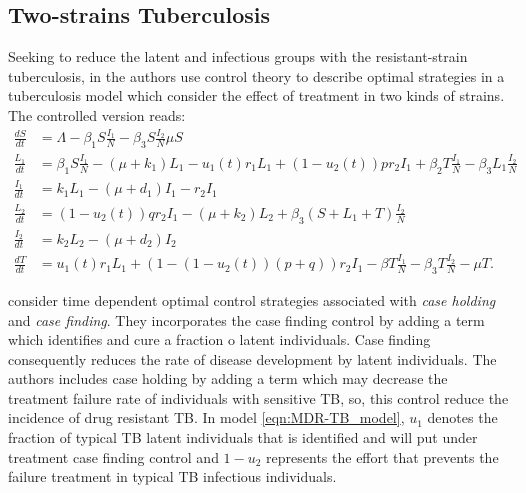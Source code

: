 \subsection{Two-strains Tuberculosis}
Seeking to reduce the latent and infectious groups with the 
resistant-strain tuberculosis, in \cite{Lenhart2002} the authors  use 
control theory to describe optimal strategies in a tuberculosis model 
which consider the effect of treatment in two kinds of strains. The 
controlled version reads:
	\begin{equation}\label{eqn:MDR-TB_model}
	  \begin{aligned}
	    \frac{dS}{dt} &=
		    \Lambda - \beta_1 S \frac{I_1}{N} 
		    - \beta_3 S \frac{I_2}{N}
		    \mu S
		  \\
		  \frac{L_1}{dt} &=
			  \beta_1 S \frac{I_1}{N}
			  - (\mu + k_1) L_1
			  - u_1 (t) r_1 L_1
			  + (1 - u_2 (t)) p r_2 I_1
				+ \beta_2 T \frac{I_1}{N}
				- \beta_3 L_1 \frac{I_2}{N}
			\\
			\frac{I_1}{dt} &= 
				k_1 L_1
				- (\mu + d_1) I_1
				-r_2 I_1
			\\
			\frac{L_2}{dt} &=
				(1 - u_2(t)) q r_2 I_1
				- (\mu + k_2) L_2
				+ \beta_3 (S + L_1 + T) \frac{I_2}{N}
			\\
			\frac{I_2}{dt} &=
				k_2 L_2 - (\mu + d_2) I_2
			\\
			\frac{d T}{dt} &=
				u_1(t) r_1 L_1
				+ (1 - (1 - u_2(t))(p + q)) r_2 I_1
				- \beta T \frac{I_1}{N}
				- \beta_3 T \frac{I_2}{N}
				-\mu T.
	  \end{aligned}
	\end{equation}

	\citeauthor*{Lenhart2002} consider time dependent 
optimal control strategies associated with \emph{case holding} and 
\emph{case finding}. They incorporates the case finding control by adding a 
term which identifies and  cure a fraction o latent individuals. Case finding
consequently reduces the rate of disease development by latent individuals. The
authors includes case holding by adding a term which may decrease the treatment
failure rate of individuals with sensitive  TB, so, this control reduce the
incidence of drug resistant TB. In model \eqref{eqn:MDR-TB_model}, $u_1$ denotes
the fraction of typical TB latent individuals that is identified and will put
under treatment \textemdash case finding control \textemdash and $1 - u_2$
represents the effort that prevents the failure treatment in typical TB
infectious individuals.

